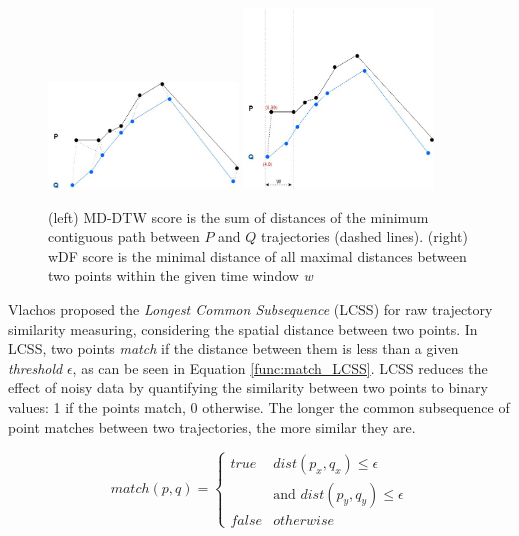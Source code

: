 \begin{figure}[h]
\centering
\includegraphics[width=0.45\textwidth]{Related_Works/related_trajes-DTW.jpg}
\includegraphics[width=0.45\textwidth]{Related_Works/related_trajes-wDF.jpg}
\caption{\label{fig:related_trajes_wDF_DTW}(left) {MD-DTW score is the sum of distances of the minimum contiguous path between $P$ and $Q$ trajectories (dashed lines)}. (right) wDF score is the minimal distance of all maximal distances between two points within the given time window \textit{w}}
\end{figure}

Vlachos \cite{vlachos2002discovering} proposed the \emph{Longest Common Subsequence} (LCSS) for raw trajectory similarity measuring, considering the spatial distance between two points. In {LCSS}, two points \textit{match} if the distance between them is less than a given \textit{threshold} $\epsilon$, as can be seen in Equation \ref{func:match_LCSS}. LCSS reduces the effect of noisy data by quantifying the similarity between two points to binary values: 1 if the points match, 0 otherwise. The longer the common subsequence of point matches between two trajectories, the more similar they are. 

\begin{equation}
\label{func:match_LCSS}
  match(p, q) = 
  \begin{cases} 
      true & dist(p_x, q_x)  \leq \epsilon\\ 
        &            \text{and } dist(p_y, q_y)  \leq \epsilon\\
      false & otherwise
  \end{cases}
\end{equation}

